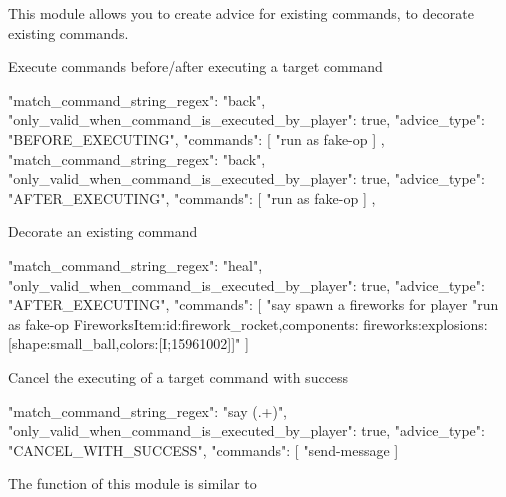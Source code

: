\label{ch:command_advice}

This module allows you to create advice for existing commands, to decorate existing commands.

\begin{example}{Execute commands before/after executing a target command}
    \begin{jsoncode}
    {
      "match_command_string_regex": "back",
      "only_valid_when_command_is_executed_by_player": true,
      "advice_type": "BEFORE_EXECUTING",
      "commands": [
        "run as fake-op %
      ]
    },
    {
      "match_command_string_regex": "back",
      "only_valid_when_command_is_executed_by_player": true,
      "advice_type": "AFTER_EXECUTING",
      "commands": [
        "run as fake-op %
      ]
    },
    \end{jsoncode}
\end{example}

\begin{example}{Decorate an existing command}
    \begin{jsoncode}
    {
      "match_command_string_regex": "heal",
      "only_valid_when_command_is_executed_by_player": true,
      "advice_type": "AFTER_EXECUTING",
      "commands": [
        "say spawn a fireworks for player %
        "run as fake-op %
{FireworksItem:{id:firework_rocket,components:
{fireworks:{explosions:[{shape:small_ball,colors:[I;15961002]}]}}}}"
      ]
    }
    \end{jsoncode}
\end{example}

\begin{example}{Cancel the executing of a target command with success}
    \begin{jsoncode}
    {
      "match_command_string_regex": "say (.+)",
      "only_valid_when_command_is_executed_by_player": true,
      "advice_type": "CANCEL_WITH_SUCCESS",
      "commands": [
        "send-message %
      ]
    }
    \end{jsoncode}
\end{example}

The function of this module is similar to~
